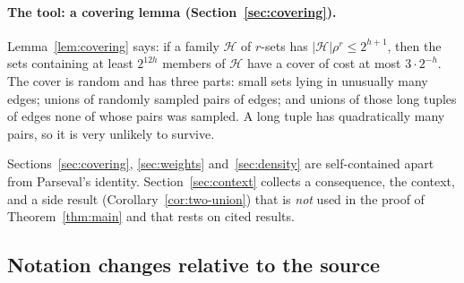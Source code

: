 \documentclass[11pt,letterpaper]{article}
\theoremstyle{definition}
\theoremstyle{remark}
\numberwithin{equation}{section}
\begin{document}
\paragraph{The tool: a covering lemma (Section~\ref{sec:covering}).}
Lemma~\ref{lem:covering} says: if a family $\mathcal H$ of $r$-sets has
$|\mathcal H|\rho^r\le2^{h+1}$, then the sets containing at least $2^{12h}$
members of $\mathcal H$ have a cover of cost at most $3\cdot2^{-h}$. The
cover is random and has three parts: small sets lying in unusually many
edges; unions of randomly sampled pairs of edges; and unions of those long
tuples of edges none of whose pairs was sampled. A long tuple has
quadratically many pairs, so it is very unlikely to survive.

\begin{center}
\end{center}

Sections~\ref{sec:covering}, \ref{sec:weights} and~\ref{sec:density} are
self-contained apart from Parseval's identity. Section~\ref{sec:context}
collects a consequence, the context, and a side result
(Corollary~\ref{cor:two-union}) that is \emph{not} used in the proof of
Theorem~\ref{thm:main} and that rests on cited results.

\subsection{Notation changes relative to the source}
\end{document}
